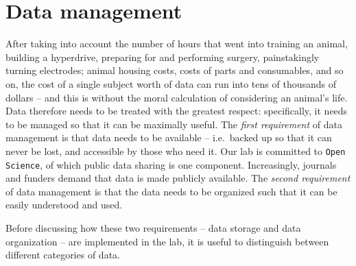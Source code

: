 \documentclass{tufte-book}
\newcommand{\doccls}[1]{\texttt{#1}}%
\begin{document}
\chapter{Data management}

 After taking into account the number of
hours that went into training an animal, building a hyperdrive,
preparing for and performing surgery, painstakingly turning
electrodes; animal housing costs, costs of parts and consumables, and
so on, the cost of a single subject worth of data can run into tens of
thousands of dollars -- and this is without the moral calculation of
considering an animal's life. Data therefore needs to be treated with
the greatest respect: specifically, it needs to be managed so that it
can be maximally useful. The {\it first requirement} of data
management is that data needs to be available -- i.e.\ backed up so
that it can never be lost, and accessible by those who need it. Our
lab is committed to \doccls{Open Science}, of which public data
sharing is one component. Increasingly, journals and funders demand
that data is made publicly available. The {\it second requirement} of
data management is that the data needs to be organized such that it
can be easily understood and used.

Before discussing how these two requirements -- data storage and data
organization -- are implemented in the lab, it is useful to
distinguish between different categories of data.
\end{document}
